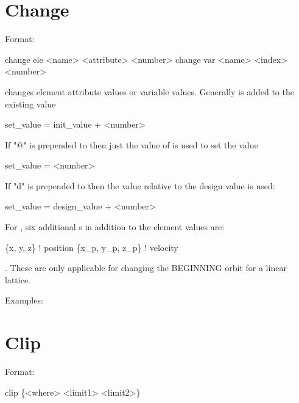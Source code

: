 \section{Change}
\label{s:change}

Format:
\begin{example}
  change ele <name> <attribute> <number>
  change var <name> <index> <number>
\end{example}

\vskip 0.2in
 changes element attribute values or variable values. Generally
 is added to the existing value
\begin{example}
  set_value = init_value + <number>
\end{example}
If "@" is prepended to  then just the value of
 is used to set the value
\begin{example}
  set_value = <number>
\end{example}
If "d" is prepended to   then the value relative to the design
value is used:
\begin{example}
  set_value = design_value + <number>
\end{example}

For , six additional
s in addition to the element values are:
\begin{example}
  \{x, y, z\}           ! position 
  \{x\_p, y\_p, z\_p\}  ! velocity
\end{example}.
These are only applicable for changing the BEGINNING orbit for a
linear lattice.

Examples:


\section{Clip}
\label{s:clip}

Format:
\begin{example}
  clip \{<where> <limit1> <limit2>\}
\end{example}

